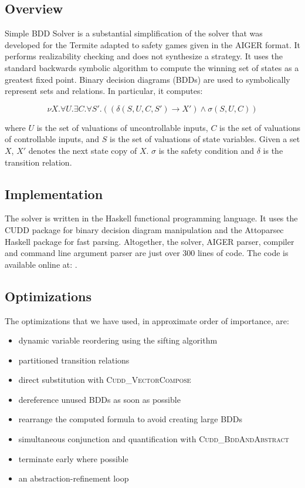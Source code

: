 \subsection{Overview}
Simple BDD Solver is a substantial simplification of the solver that was developed for the Termite adapted to safety games given in the AIGER format. It performs realizability checking and does not synthesize a strategy. It uses the standard backwards symbolic algorithm to compute the winning set of states as a greatest fixed point. Binary decision diagrams (BDDs) are used to symbolically represent sets and relations. In particular, it computes:

\begin{equation}
\label{eqn:mu}
\nu X. \forall U. \exists C. \forall S'. ((\delta(S, U, C, S') \rightarrow X') \wedge \sigma(S, U, C))
\end{equation}

\noindent where $U$ is the set of valuations of uncontrollable inputs, $C$ is the set of valuations of controllable inputs, and $S$ is the set of valuations of state variables. Given a set $X$, $X'$ denotes the next state copy of $X$. $\sigma$ is the safety condition and $\delta$ is the transition relation.

\subsection{Implementation}
The solver is written in the Haskell functional programming language. It uses the CUDD \cite{cudd} package for binary decision diagram manipulation and the Attoparsec Haskell package for fast parsing. Altogether, the solver, AIGER parser, compiler and command line argument parser are just over 300 lines of code. The code is available online at: .

\subsection{Optimizations}
\label{sec:syntcomp_optimisations}

The optimizations that we have used, in approximate order of importance, are:
\begin{itemize}
    \item dynamic variable reordering using the sifting algorithm \cite{Rudell_1993}
    \item partitioned transition relations \cite{Burch_91}
    \item direct substitution with \textsc{Cudd\_VectorCompose}
    \item dereference unused BDDs as soon as possible
    \item rearrange the computed formula to avoid creating large BDDs
    \item simultaneous conjunction and quantification with \textsc{Cudd\_BddAndAbstract}
    \item terminate early where possible
    \item an abstraction-refinement loop
\end{itemize}


